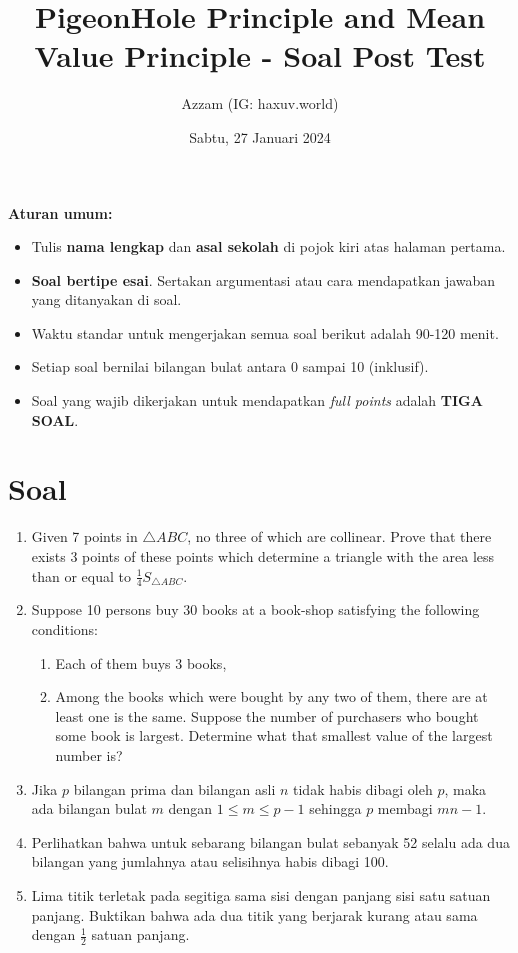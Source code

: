 \documentclass[11pt]{scrartcl}
\title{PigeonHole Principle and Mean Value Principle - Soal Post Test}
\author{Azzam (IG: haxuv.world)}
\date{Sabtu, 27 Januari 2024}
\begin{document}
\maketitle
\textbf{Aturan umum:}
\begin{itemize}
    \item Tulis \textbf{nama lengkap} dan \textbf{asal sekolah} di pojok kiri atas halaman pertama.
    \item \textbf{Soal bertipe esai}. Sertakan argumentasi atau cara mendapatkan jawaban yang ditanyakan di soal.
    \item Waktu standar untuk mengerjakan semua soal berikut adalah 90-120 menit.
    \item Setiap soal bernilai bilangan bulat antara 0 sampai 10 (inklusif).
    \item Soal yang wajib dikerjakan untuk mendapatkan \textit{full points} adalah \textbf{TIGA SOAL}.
\end{itemize}


\section{Soal}
\begin{enumerate}
    \item Given 7 points in $\triangle ABC$, no three of which are collinear. Prove that there exists 3 points of these points which determine a triangle with the area less than or equal to $\frac{1}{4} S_{\triangle ABC}$.

       \item Suppose 10 persons buy 30 books at a book-shop satisfying the following conditions:
    \begin{enumerate}
        \item Each of them buys 3 books,
        \item Among the books which were bought by any two of them, there are at least one is the same. 
        Suppose the number of purchasers who bought some book is largest. Determine what that smallest value of the largest number is? 
    \end{enumerate}
    
    \item Jika $p$ bilangan prima dan bilangan asli $n$ tidak habis dibagi oleh $p$, maka ada bilangan bulat $m$ dengan $1 \leq m \leq p - 1$ sehingga $p$ membagi $mn - 1$.\\

    \item Perlihatkan bahwa untuk sebarang bilangan bulat sebanyak 52 selalu ada dua bilangan yang jumlahnya atau selisihnya habis dibagi 100.

    \item Lima titik terletak pada segitiga sama sisi dengan panjang sisi satu satuan panjang. Buktikan bahwa ada dua titik yang berjarak kurang atau sama dengan $\frac{1}{2}$ satuan panjang.
\end{enumerate}
\end{document}
